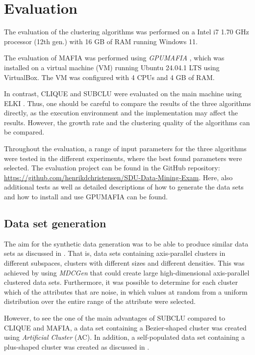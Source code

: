 \section{Evaluation}
The evaluation of the clustering algorithms was performed on a Intel i7 1.70 GHz processor (12th gen.) with 16 GB of RAM running Windows 11.

The evaluation of MAFIA was performed using \textit{GPUMAFIA} \cite{gpumafia}, which was installed on a virtual machine (VM) running Ubuntu 24.04.1 LTS using VirtualBox. The VM was configured with 4 CPUs and 4 GB of RAM.

In contrast, CLIQUE and SUBCLU were evaluated on the main machine using ELKI \cite{elki}. Thus, one should be careful to compare the results of the three algorithms directly, as the execution environment and the implementation may affect the results. However, the growth rate and the clustering quality of the algorithms can be compared.

Throughout the evaluation, a range of input parameters for the three algorithms were tested in the different experiments, where the best found parameters were selected. The evaluation project can be found in the GitHub repository: \url{https://github.com/henrikdchristensen/SDU-Data-Mining-Exam}. Here, also additional tests as well as detailed descriptions of how to generate the data sets and how to install and use GPUMAFIA can be found.

\subsection{Data set generation}
The aim for the synthetic data generation was to be able to produce similar data sets as discussed in \cite{mafia}. That is, data sets containing axis-parallel clusters in different subspaces, clusters with different sizes and different densities. This was achieved by using \textit{MDCGen} that could create large high-dimensional axis-parallel clustered data sets. Furthermore, it was possible to determine for each cluster which of the attributes that are noise, in which values at random from a uniform distribution over the entire range of the attribute were selected.

However, to see the one of the main advantages of SUBCLU compared to CLIQUE and MAFIA, a data set containing a Bezier-shaped cluster was created using \textit{Artificial Cluster} (AC). In addition, a self-populated data set containing a plus-shaped cluster was created as discussed in \cite{mafia}.

